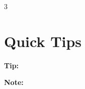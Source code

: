 \documentclass[9pt,a4paper,landscape]{extarticle}
\begin{document}
\begin{multicols}{3}

\section{Quick Tips}

\begin{tipbox}
\textbf{Tip:} %
\end{tipbox}

\begin{notebox}
\textbf{Note:} %
\end{notebox}

\end{multicols}
\end{document}
